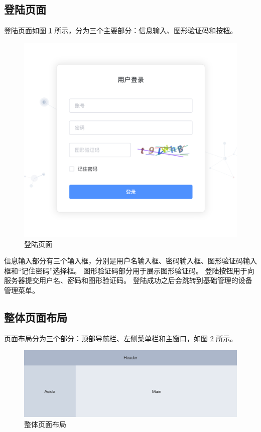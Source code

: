 \subsection{登陆页面}

登陆页面如图 \ref{Fig:login} 所示，分为三个主要部分：信息输入、图形验证码和按钮。

\begin{figure}[ht]
    \centering
    \includegraphics[width=0.8\linewidth]{./Figure/IMG_login.png}
    \caption{登陆页面}\label{Fig:login}
\end{figure}

信息输入部分有三个输入框，分别是用户名输入框、密码输入框、图形验证码输入框和“记住密码”选择框。
图形验证码部分用于展示图形验证码。
登陆按钮用于向服务器提交用户名、密码和图形验证码。
登陆成功之后会跳转到基础管理的设备管理菜单。

\subsection{整体页面布局}
页面布局分为三个部分：顶部导航栏、左侧菜单栏和主窗口，如图 \ref{Fig:layout} 所示。

\begin{figure}[ht]
    \centering
    \includegraphics[width=1\linewidth]{./Figure/IMG_layout.png}
    \caption{整体页面布局}\label{Fig:layout}
\end{figure}

